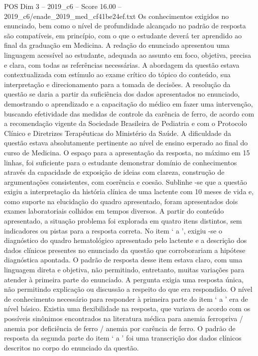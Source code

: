 \begin{textsample}{POS Dim 3 – 2019\_c6 – Score 16.00 – 2019\_c6/enade\_2019\_med\_cf41be24ef.txt}
Os conhecimentos exigidos no enunciado, bem como o nível de profundidade alcançado no padrão de resposta são compatíveis, em princípio, com o que o estudante deverá ter aprendido ao final da graduação em Medicina.
A redação do enunciado apresentou uma linguagem acessível ao estudante, adequada ao assunto em foco, objetiva, precisa e clara, com todas as referências necessárias.
A abordagem da questão estava contextualizada com estímulo ao exame crítico do tópico do conteúdo, sua interpretação e direcionamento para a tomada de decisões.
A resolução da questão se daria a partir da suficiência dos dados apresentados no enunciado, demostrando o aprendizado e a capacitação do médico em fazer uma intervenção, buscando efetividade das medidas de controle da carência de ferro, de acordo com a recomendação vigente da Sociedade Brasileira de Pediatria e com o Protocolo Clínico e Diretrizes Terapêuticas do Ministério da Saúde.
A dificuldade da questão estava absolutamente pertinente ao nível de ensino esperado ao final do curso de Medicina.
O espaço para a apresentação da resposta, no máximo em 15 linhas, foi suficiente para o estudante demonstrar domínio de conhecimentos através da capacidade de exposição de ideias com clareza, construção de argumentações consistentes, com coerência e coesão.
Sublinhe -se que a questão exigiu a interpretação da história clínica de uma lactente com 10 meses de vida e, como suporte na elucidação do quadro apresentado, foram apresentados dois exames laboratoriais colhidos em tempos diversos.
A partir do conteúdo apresentado, a situação problema foi explorada em quatro itens distintos, sem indicadores ou pistas para a resposta correta.
No item ‘ a ’, exigiu -se o diagnóstico do quadro hematológico apresentado pelo lactente e a descrição dos dados clínicos presentes no enunciado da questão que corroborariam a hipótese diagnóstica apontada.
O padrão de resposta desse item estava claro, com uma linguagem direta e objetiva, não permitindo, entretanto, muitas variações para atender à primeira parte do enunciado.
A pergunta exigia uma resposta única, não permitindo explicação ou discussão a respeito do que era respondido.
O nível de conhecimento necessário para responder à primeira parte do item ‘ a ’ era de nível básico.
Existia uma flexibilidade na resposta, que variava de acordo com os possíveis sinônimos encontrados na literatura médica para anemia ferropriva / anemia por deficiência de ferro / anemia por carência de ferro.
O padrão de resposta da segunda parte do item ‘ a ’ foi uma transcrição dos dados clínicos descritos no corpo do enunciado da questão.

\end{textsample}
